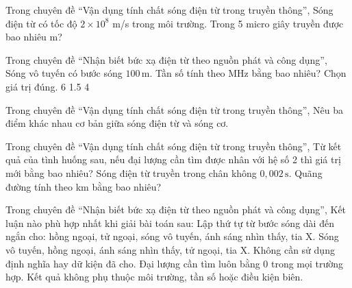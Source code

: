 \begin{ex}
Trong chuyên đề “Vận dụng tính chất sóng điện từ trong truyền thông”, Sóng điện từ có tốc độ $2\times10^8$ m/s trong môi trường. Trong 5 micro giây truyền được bao nhiêu m?
\end{ex}

\begin{ex}
Trong chuyên đề “Nhận biết bức xạ điện từ theo nguồn phát và công dụng”, Sóng vô tuyến có bước sóng $100\,\text{m}$. Tần số tính theo MHz bằng bao nhiêu? Chọn giá trị đúng.
\choice
{6}
{1.5}
{4}
{}
\end{ex}

\begin{ex}
Trong chuyên đề “Vận dụng tính chất sóng điện từ trong truyền thông”, Nêu ba điểm khác nhau cơ bản giữa sóng điện từ và sóng cơ.
\choiceTF

\end{ex}

\begin{ex}
Trong chuyên đề “Vận dụng tính chất sóng điện từ trong truyền thông”, Từ kết quả của tình huống sau, nếu đại lượng cần tìm được nhân với hệ số 2 thì giá trị mới bằng bao nhiêu? Sóng điện từ truyền trong chân không $0,002\,\text{s}$. Quãng đường tính theo km bằng bao nhiêu?
\end{ex}

\begin{ex}
Trong chuyên đề “Nhận biết bức xạ điện từ theo nguồn phát và công dụng”, Kết luận nào phù hợp nhất khi giải bài toán sau: Lập thứ tự từ bước sóng dài đến ngắn cho: hồng ngoại, tử ngoại, sóng vô tuyến, ánh sáng nhìn thấy, tia X.
\choice
{\True Sóng vô tuyến, hồng ngoại, ánh sáng nhìn thấy, tử ngoại, tia X.}
{Không cần sử dụng định nghĩa hay dữ kiện đã cho.}
{Đại lượng cần tìm luôn bằng 0 trong mọi trường hợp.}
{Kết quả không phụ thuộc môi trường, tần số hoặc điều kiện biên.}
\end{ex}

